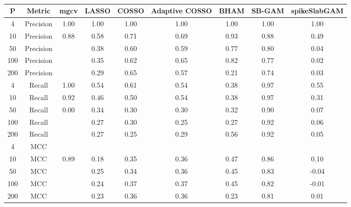 \begin{table}[ht]
\centering
\begin{tabular}{ccccccccc}
  \hline
P & Metric & mgcv & LASSO & COSSO & Adaptive COSSO & BHAM & SB-GAM & spikeSlabGAM \\ 
  \hline
  4 & Precision & 1.00 & 1.00 & 1.00 & 1.00 & 1.00 & 1.00 & 1.00 \\ 
   10 & Precision & 0.88 & 0.58 & 0.71 & 0.69 & 0.93 & 0.88 & 0.49 \\ 
   50 & Precision &  & 0.38 & 0.60 & 0.59 & 0.77 & 0.80 & 0.04 \\ 
  100 & Precision &  & 0.35 & 0.62 & 0.65 & 0.82 & 0.77 & 0.02 \\ 
  200 & Precision &  & 0.29 & 0.65 & 0.57 & 0.21 & 0.74 & 0.03 \\ 
    4 & Recall & 1.00 & 0.54 & 0.61 & 0.54 & 0.38 & 0.97 & 0.55 \\ 
   10 & Recall & 0.92 & 0.46 & 0.50 & 0.54 & 0.38 & 0.97 & 0.31 \\ 
   50 & Recall & 0.00 & 0.34 & 0.30 & 0.30 & 0.32 & 0.90 & 0.07 \\ 
  100 & Recall &  & 0.27 & 0.30 & 0.25 & 0.27 & 0.92 & 0.06 \\ 
  200 & Recall &  & 0.27 & 0.25 & 0.29 & 0.56 & 0.92 & 0.05 \\ 
    4 & MCC &  &  &  &  &  &  &  \\ 
   10 & MCC & 0.89 & 0.18 & 0.35 & 0.36 & 0.47 & 0.86 & 0.10 \\ 
   50 & MCC &  & 0.25 & 0.34 & 0.36 & 0.45 & 0.83 & -0.04 \\ 
  100 & MCC &  & 0.24 & 0.37 & 0.37 & 0.45 & 0.82 & -0.01 \\ 
  200 & MCC &  & 0.23 & 0.36 & 0.36 & 0.23 & 0.81 & 0.01 \\ 
   \hline
\end{tabular}
\caption{} 
\label{}
\end{table}
